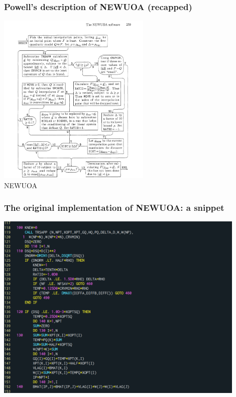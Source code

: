 \documentclass[slidestop,mathserif,xcolor=dvipsnames]{beamer}
\begin{document}
\begin{frame}
    \frametitle{Powell's description of NEWUOA (recapped)}
    \vspace{-2ex}
\begin{center}
    \includegraphics[width = 0.55\textwidth]{newuoa_alg.png}
    \\[1ex]NEWUOA
\end{center}
\end{frame}


\begin{frame}
    \frametitle{The original implementation of NEWUOA: a snippet}
    \vspace{-1ex}
    \begin{center}
        \includegraphics[width=0.9\textwidth]{newuoa_orig.png}
    \end{center}
\end{frame}
\end{document}
